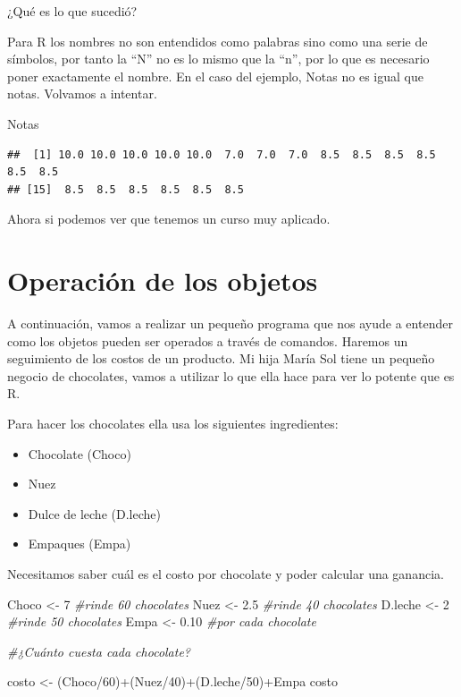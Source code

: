 \documentclass[]{article}
\newenvironment{Shaded}{\begin{snugshade}}{\end{snugshade}}
\newcommand{\DecValTok}[1]{\textcolor[rgb]{0.00,0.00,0.81}{{#1}}}
\newcommand{\FloatTok}[1]{\textcolor[rgb]{0.00,0.00,0.81}{{#1}}}
\newcommand{\StringTok}[1]{\textcolor[rgb]{0.31,0.60,0.02}{{#1}}}
\newcommand{\CommentTok}[1]{\textcolor[rgb]{0.56,0.35,0.01}{\textit{{#1}}}}
\newcommand{\NormalTok}[1]{{#1}}
\providecommand{\tightlist}{%
  \setlength{\itemsep}{0pt}\setlength{\parskip}{0pt}}
\begin{document}
¿Qué es lo que sucedió?

Para R los nombres no son entendidos como palabras sino como una serie
de símbolos, por tanto la ``N'' no es lo mismo que la ``n'', por lo que
es necesario poner exactamente el nombre. En el caso del ejemplo, Notas
no es igual que notas. Volvamos a intentar.

\begin{Shaded}
\begin{Highlighting}[]
\NormalTok{Notas}
\end{Highlighting}
\end{Shaded}

\begin{verbatim}
##  [1] 10.0 10.0 10.0 10.0 10.0  7.0  7.0  7.0  8.5  8.5  8.5  8.5  8.5  8.5
## [15]  8.5  8.5  8.5  8.5  8.5  8.5
\end{verbatim}

Ahora si podemos ver que tenemos un curso muy aplicado.

\section{Operación de los objetos}\label{operacion-de-los-objetos}

A continuación, vamos a realizar un pequeño programa que nos ayude a
entender como los objetos pueden ser operados a través de comandos.
Haremos un seguimiento de los costos de un producto. Mi hija María Sol
tiene un pequeño negocio de chocolates, vamos a utilizar lo que ella
hace para ver lo potente que es R.

Para hacer los chocolates ella usa los siguientes ingredientes:

\begin{itemize}
\tightlist
\item
  Chocolate (Choco)
\item
  Nuez
\item
  Dulce de leche (D.leche)
\item
  Empaques (Empa)
\end{itemize}

Necesitamos saber cuál es el costo por chocolate y poder calcular una
ganancia.

\begin{Shaded}
\begin{Highlighting}[]
\NormalTok{Choco <-}\StringTok{ }\DecValTok{7} \CommentTok{#rinde 60 chocolates}
\NormalTok{Nuez <-}\StringTok{ }\FloatTok{2.5} \CommentTok{#rinde 40 chocolates}
\NormalTok{D.leche <-}\StringTok{ }\DecValTok{2} \CommentTok{#rinde 50 chocolates}
\NormalTok{Empa <-}\StringTok{ }\FloatTok{0.10} \CommentTok{#por cada chocolate}

\CommentTok{#¿Cuánto cuesta cada chocolate?}

\NormalTok{costo <-}\StringTok{ }\NormalTok{(Choco/}\DecValTok{60}\NormalTok{)+(Nuez/}\DecValTok{40}\NormalTok{)+(D.leche/}\DecValTok{50}\NormalTok{)+Empa}
\NormalTok{costo}
\end{Highlighting}
\end{Shaded}
\end{document}
